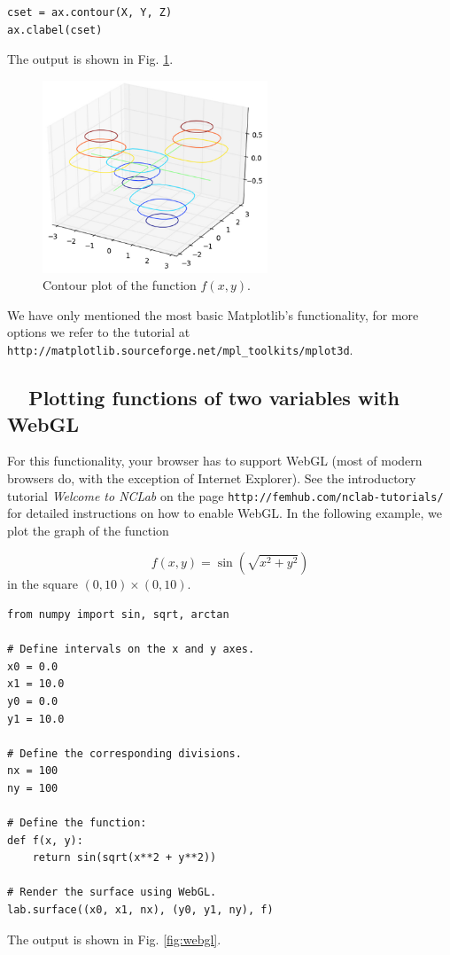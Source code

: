 \begin{verbatim}
cset = ax.contour(X, Y, Z)
ax.clabel(cset)
\end{verbatim}
The output is shown in Fig. \ref{fig:plot3d-4}.

\begin{figure}[!ht]
\begin{center}
\includegraphics[width=0.6\textwidth]{imgp/plot3d-4.png}
\end{center}
\vspace{-4mm}
\caption{Contour plot of the function $f(x, y)$.}
\label{fig:plot3d-4}
\end{figure}
\noindent
We have only mentioned the most basic Matplotlib's functionality, for more options 
we refer to the tutorial 
at {\tt http://matplotlib.sourceforge.net/mpl\_toolkits/mplot3d}.


\subsection{\ \ Plotting functions of two variables with WebGL}

For this functionality, your browser has to support WebGL (most of modern browsers do, 
with the exception of Internet Explorer). See the introductory tutorial {\em Welcome to NCLab}
on the page {\tt http://femhub.com/nclab-tutorials/} for detailed instructions on how to enable WebGL. 
In the following example, we plot the graph of the function 

$$
  f(x, y) = \sin(\sqrt{x^2 + y^2})
$$
in the square $(0, 10) \times (0, 10)$.

\begin{verbatim}
from numpy import sin, sqrt, arctan

# Define intervals on the x and y axes.
x0 = 0.0
x1 = 10.0
y0 = 0.0
y1 = 10.0

# Define the corresponding divisions.
nx = 100
ny = 100

# Define the function:
def f(x, y):
    return sin(sqrt(x**2 + y**2))

# Render the surface using WebGL.
lab.surface((x0, x1, nx), (y0, y1, ny), f)
\end{verbatim}
The output is shown in Fig. \ref{fig:webgl}.

